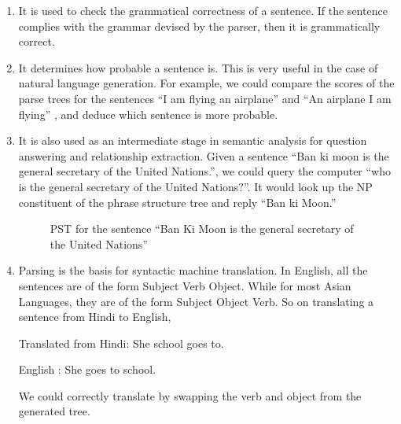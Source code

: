 \documentclass{book}
\begin{document}
\begin{enumerate}

\item It is used to check the grammatical correctness of a sentence. If the sentence complies with the grammar devised by the parser, then it is grammatically correct.

\item It determines how probable a sentence is. This is very useful in the case of natural language generation. For example, we could compare the scores of the parse trees for the sentences ``I am flying an airplane'' and ``An airplane I am flying'' , and deduce which sentence is more probable.

\item It is also used as an intermediate stage in semantic analysis for question answering and relationship extraction. Given a sentence ``Ban ki moon is the general secretary of the United Nations.'', we could query the computer ``who is the general secretary of the United Nations$?$''. It would look up the NP constituent of the phrase structure tree and reply ``Ban ki Moon.''



\begin{figure}
\centering
{}
\caption{PST for the sentence ``Ban Ki Moon is the general secretary of the United Nations''}
\end{figure}


\item Parsing is the basis for syntactic machine translation. In English, all the sentences are of the form Subject Verb Object. While for most Asian Languages, they are of the form Subject Object Verb. So on translating a sentence from Hindi to English,

Translated from Hindi: She school goes to.

English : She goes to school.

We could correctly translate by swapping the verb and object from the generated tree.



\end{enumerate}
\end{document}
